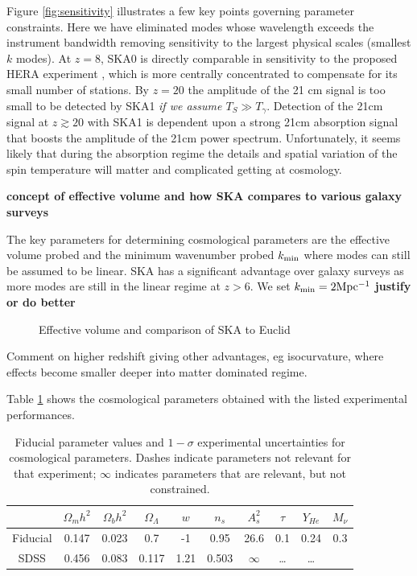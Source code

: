 \documentclass{PoS}
\begin{document}
Figure \ref{fig:sensitivity} illustrates a few key points governing parameter constraints. Here we have eliminated modes whose wavelength exceeds the instrument bandwidth removing sensitivity to the largest physical scales (smallest $k$ modes). At $z=8$, SKA0 is directly comparable in sensitivity to the proposed HERA experiment \cite{2014ApJ...782...66P}, which is more centrally concentrated to compensate for its small number of stations. By $z=20$ the amplitude of the 21 cm signal is too small to be detected by SKA1 {\em if we assume $T_S\gg T_\gamma$}. Detection of the 21cm signal at $z\gtrsim20$ with SKA1 is dependent upon a strong 21cm absorption signal that boosts the amplitude of the 21cm power spectrum. Unfortunately, it seems likely that during the absorption regime the details and spatial variation of the spin temperature will matter and complicated getting at cosmology.

{\bf concept of effective volume and how SKA compares to various galaxy surveys}

The key parameters for determining cosmological parameters are the effective volume probed and the minimum wavenumber probed $k_{\rm min}$ where modes can still be assumed to be linear. SKA has a significant advantage over galaxy surveys as more modes are still in the linear regime at $z>6$. We set $k_{\rm min}=2{\rm Mpc^{-1}}$ {\bf justify or do better}

\begin{figure}[htbp]
\begin{center}

\caption{Effective volume and comparison of SKA to Euclid}
\label{fig:effectivevolume}
\end{center}
\end{figure}

Comment on higher redshift giving other advantages, eg isocurvature, where effects become smaller deeper into matter dominated regime.

Table \ref{tab:constraints} shows the cosmological parameters obtained with the listed experimental performances.

\begin{table}[htdp]
\caption{Fiducial parameter values and $1-\sigma$ experimental uncertainties for cosmological parameters.  Dashes indicate parameters not relevant for that experiment; $\infty$ indicates parameters that are relevant, but not constrained. }
\begin{center}
\begin{tabular}{c|cccccccc|c}
\hline
& $\Omega_mh^2$ & $\Omega_bh^2$ & $\Omega_\Lambda$ & $w$ & $n_s$ & $A^2_s$ & $\tau$ & $Y_{He}$  & $M_\nu$ \\
\hline
Fiducial& 0.147 & 0.023 & 0.7 & -1 & 0.95 & 26.6 & 0.1 & 0.24 & 0.3  \\
\hline
SDSS& 0.456 & 0.083 & 0.117 & 1.21 & 0.503 & $\infty$ & \ldots & \ldots   \\
\end{tabular}
\end{center}
\label{tab:constraints}
\end{table}
\end{document}
